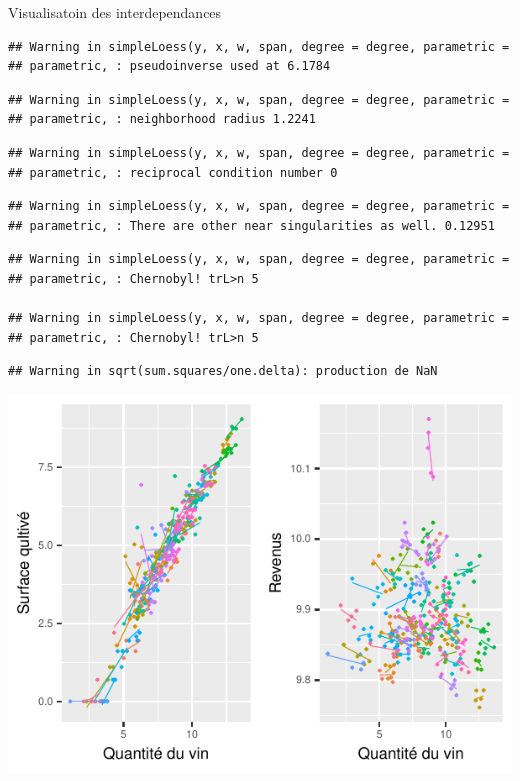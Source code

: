 \documentclass[11pt,ignorenonframetext,]{beamer}
\begin{document}
\begin{frame}[fragile]{Visualisatoin des interdependances}
\begin{verbatim}
## Warning in simpleLoess(y, x, w, span, degree = degree, parametric =
## parametric, : pseudoinverse used at 6.1784
\end{verbatim}

\begin{verbatim}
## Warning in simpleLoess(y, x, w, span, degree = degree, parametric =
## parametric, : neighborhood radius 1.2241
\end{verbatim}

\begin{verbatim}
## Warning in simpleLoess(y, x, w, span, degree = degree, parametric =
## parametric, : reciprocal condition number 0
\end{verbatim}

\begin{verbatim}
## Warning in simpleLoess(y, x, w, span, degree = degree, parametric =
## parametric, : There are other near singularities as well. 0.12951
\end{verbatim}

\begin{verbatim}
## Warning in simpleLoess(y, x, w, span, degree = degree, parametric =
## parametric, : Chernobyl! trL>n 5

## Warning in simpleLoess(y, x, w, span, degree = degree, parametric =
## parametric, : Chernobyl! trL>n 5
\end{verbatim}

\begin{verbatim}
## Warning in sqrt(sum.squares/one.delta): production de NaN
\end{verbatim}

\includegraphics{Presentation_files/figure-beamer/unnamed-chunk-13-1.pdf}

\end{frame}
\end{document}
